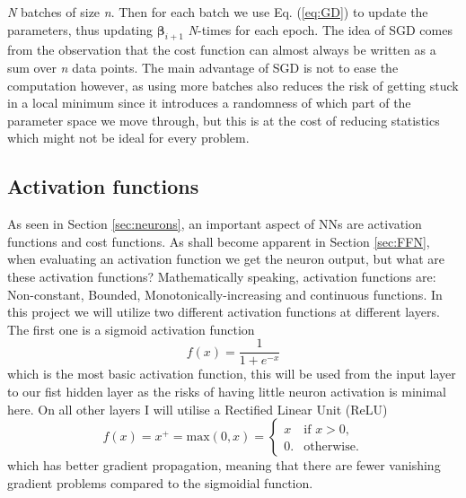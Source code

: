 \documentclass[14pt, a4paper]{book}
\begin{document}
\textit{N} batches of size \textit{n}. Then for each batch we use Eq. (\ref{eq:GD}) to update the parameters, thus updating $\bm{\beta}_{i+1}$ \textit{N}-times for each epoch. The idea of SGD comes from the observation that the 
cost function can almost always be written as a sum over \textit{n} data points. The main advantage of SGD is not to ease the computation however, as using more batches also reduces the risk of getting stuck in a local minimum since it introduces a randomness of which part of the parameter space we move through, 
but this is at the cost of reducing statistics which might not be ideal for every problem.


\subsection{Activation functions}\label{sec:act}
As seen in Section \ref{sec:neurons}, an important aspect of NNs are activation functions and cost functions. As shall become apparent in Section \ref{sec:FFN}, when evaluating an activation function we get the neuron output, but what are these activation functions? 
Mathematically speaking, activation functions are: Non-constant, Bounded, Monotonically-increasing and continuous functions. In this project we will utilize two different activation functions at different layers. 
The first one is a sigmoid activation function
\begin{equation}\label{eq:sig}
    f(x) = \frac{1}{1+e^{-x}}
\end{equation}
which is the most basic activation function, this will be used from the input layer to our fist hidden layer as the risks of having little neuron activation is minimal here. On all other layers I will utilise a Rectified Linear Unit (ReLU)
\begin{equation}\label{eq:ReLU}
    f(x) = x^+ = \text{max}(0,x) = \begin{cases}x&{\text{if }}x>0,\\0.&{\text{otherwise}}.\end{cases}
\end{equation}
which has better gradient propagation, meaning that there are fewer vanishing gradient problems compared to the sigmoidial function.
\end{document}
